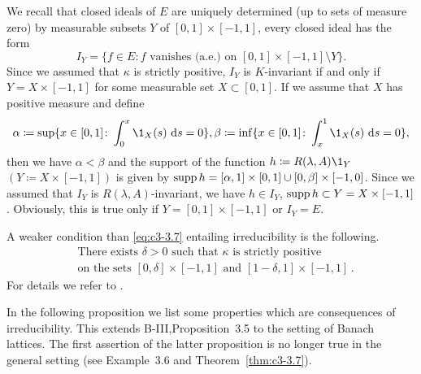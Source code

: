 \begin{examples}
\begin{enumerate}
	We recall that closed ideals of $E$ are uniquely determined (up to sets of measure zero) by measurable subsets $Y$ of $[0,1]\times[-1,1]$, \ie  every closed ideal has the form
	\[
		I_{Y} = \{f \in E \colon f \text{ vanishes (a.e.) on } [0,1]\times[-1,1] \setminus Y\}.
	\]
	Since we assumed that $\kappa$ is strictly positive, $I_{Y}$ is $K$-invariant if and only if $Y = X\times[-1,1]$ for some measurable set $X \subset [0,1]$.
	If we assume that $X$ has positive measure and define
	\[
	\alpha \coloneqq \sup\{x \in [0,1] \colon \int_{0}^{x} \1_{X}(s)\,\ds = 0\}, \beta \coloneqq \inf\{x \in [0,1] \colon \int_{x}^{1} \1_{X}(s)\,\ds = 0\},
	\] 
	then we have $\alpha < \beta$ and the support of the function $h \coloneqq R(\lambda,A)\1_{Y}$
	$(Y \coloneqq X\times[-1,1])$ is given by $\mathop{}\!\mathrm{supp}\, h = [\alpha,1]\times[0,1] \cup [0,\beta]\times[-1,0]$.
	Since we assumed that $I_{Y}$ is $R(\lambda,A)$-invariant, we have $h \in I_{Y}$, \ie  $\mathop{}\!\mathrm{supp}\, h \subset Y = X\times[-1,1]$.
	Obviously, this is true only if $Y = [0,1]\times[-1,1]$ or $I_{Y} = E$.
	
	A weaker condition than \eqref{eq:c3-3.7} entailing irreducibility is the following.
	\begin{equation}\label{eq:c3-3.8}
		\begin{aligned}
		&\text{There exists } \delta > 0 \text{ such that } \kappa \text{ is strictly positive}\\
		&\text{on the sets } [0,\delta]\times[-1,1] \text{ and } [1-\delta,1]\times[-1,1]\,.
		\end{aligned}
	\end{equation}
	For details we refer to \citet{greiner:1984d}
    \marginpar{[Greiner (1984d)]}.
	\end{enumerate}	
\end{examples}
	
In the following proposition we list some properties which are conse­quences of irreducibility. This extends B-III,Proposition~3.5 to the setting of Banach lattices. The first assertion of the latter proposition is no longer true in the general setting (see Example~3.6 and Theorem~\ref{thm:c3-3.7}). 


